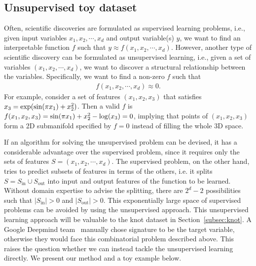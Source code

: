 \documentclass{article}
\numberwithin{equation}{section}
\numberwithin{figure}{section}
\newcommand{\todo}[1]{{\color{black!0!blue} #1}}
\begin{document}
\subsection{Unsupervised toy dataset}\label{subsec:unsupervised-interpretable}

Often, scientific discoveries are formulated as supervised learning problems, i.e., given input variables $x_1,x_2,\cdots,x_d$ and output variable(s) $y$, we want to find an interpretable function $f$ such that $y\approx f(x_1,x_2,\cdots,x_d)$. However, another type of scientific discovery can be formulated as unsupervised learning, i.e., given a set of variables $(x_1,x_2,\cdots,x_d)$, we want to discover a structural relationship between the variables. Specifically, we want to find a non-zero $f$ such that 
\begin{align}
    f(x_1,x_2,\cdots,x_d)\approx 0.
\end{align}
For example, consider a set of features $(x_1,x_2,x_3)$ that satisfies $x_3={\rm exp}({\rm sin}(\pi x_1)+x_2^2)$. Then a valid $f$ is $f(x_1,x_2,x_3)={\rm sin}(\pi x_1)+x_2^2-{\rm log}(x_3)=0$, implying that points of $(x_1,x_2,x_3)$ form a 2D submanifold specified by $f=0$ instead of filling the whole 3D space.


If an algorithm for solving the unsupervised problem can be devised, it has a considerable advantage over the supervised problem, since it requires only the sets of features $S=(x_1,x_2,\cdots,x_d)$. The supervised problem, on the other hand, tries to predict subsets of features in terms of the others, i.e. it splits $S=S_\text{in} \cup S_\text{out}$ into input and output features of the function to be learned. Without domain expertise to advise the splitting, there are $2^d-2$ possibilities such that $|S_\text{in}|>0$ and $|S_\text{out}|>0$. This exponentially large space of supervised problems can be avoided by using the unsupervised approach.
This unsupervised learning approach will be valuable to the knot dataset in Section~\ref{subsec:knot}. %
A Google Deepmind team~\cite{davies2021advancing} manually chose signature to be the target variable, otherwise they would face this combinatorial problem described above.
This raises the question whether we can instead tackle the unsupervised learning directly. We present our method and a toy example below. 
\end{document}
